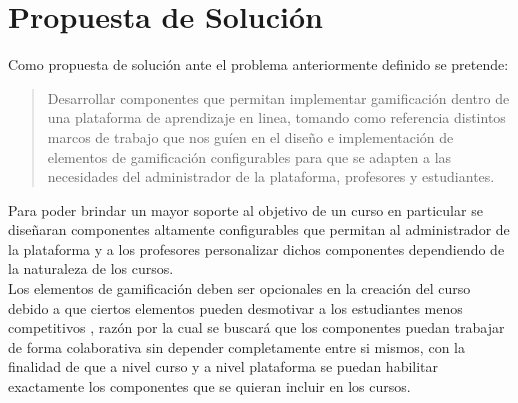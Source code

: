 
 \clearpage

\section{Propuesta de Solución} \label{sec:propuesta}

 \noindent Como propuesta de solución ante el problema anteriormente definido se pretende:

    \begin{quote}
    \colorbox{blue!05}{\parbox{\dimexpr\linewidth-2\fboxsep}{\strut%
        Desarrollar componentes que permitan implementar gamificación dentro
        de una plataforma de aprendizaje en linea, tomando como referencia
        distintos marcos de trabajo que nos guíen en el diseño e implementación
        de elementos de gamificación configurables para que se adapten a las
        necesidades del administrador de la plataforma, profesores y estudiantes.
    \strut}}%
    \end{quote}

 \noindent Para poder brindar un mayor soporte al objetivo de un curso en particular se diseñaran
 componentes altamente configurables que permitan al administrador de la plataforma y a los
 profesores personalizar dichos componentes dependiendo de la naturaleza de los cursos.\\

 \noindent Los elementos de gamificación deben ser opcionales en la creación del curso debido a que ciertos
 elementos pueden desmotivar a los estudiantes menos competitivos \cite{GamInE-Learning}, razón por la cual
 se buscará que los componentes puedan trabajar de forma colaborativa sin depender completamente entre
 si mismos, con la finalidad de que a nivel curso y a nivel plataforma se puedan habilitar exactamente
 los componentes que se quieran incluir en los cursos.\\

